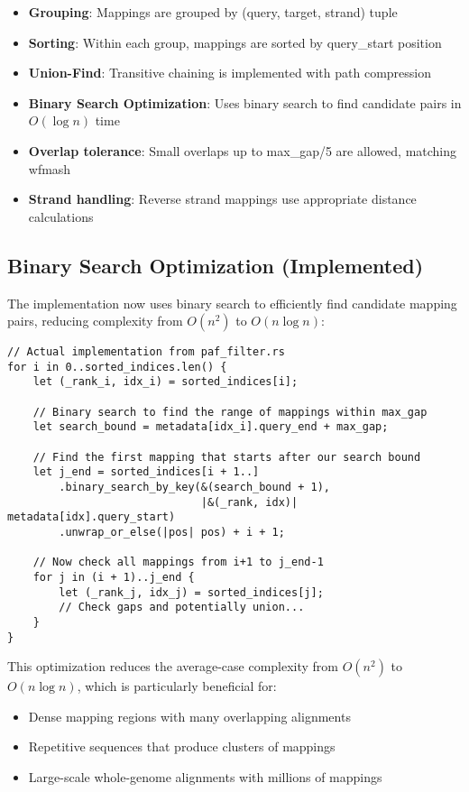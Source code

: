 \documentclass[11pt]{article}
\begin{document}
\begin{itemize}
    \item \textbf{Grouping}: Mappings are grouped by (query, target, strand) tuple
    \item \textbf{Sorting}: Within each group, mappings are sorted by query\_start position
    \item \textbf{Union-Find}: Transitive chaining is implemented with path compression
    \item \textbf{Binary Search Optimization}: Uses binary search to find candidate pairs in $O(\log n)$ time
    \item \textbf{Overlap tolerance}: Small overlaps up to max\_gap/5 are allowed, matching wfmash
    \item \textbf{Strand handling}: Reverse strand mappings use appropriate distance calculations
\end{itemize}

\subsection{Binary Search Optimization (Implemented)}

The implementation now uses binary search to efficiently find candidate mapping pairs, reducing complexity from $O(n^2)$ to $O(n \log n)$:

\begin{verbatim}
// Actual implementation from paf_filter.rs
for i in 0..sorted_indices.len() {
    let (_rank_i, idx_i) = sorted_indices[i];

    // Binary search to find the range of mappings within max_gap
    let search_bound = metadata[idx_i].query_end + max_gap;

    // Find the first mapping that starts after our search bound
    let j_end = sorted_indices[i + 1..]
        .binary_search_by_key(&(search_bound + 1),
                              |&(_rank, idx)| metadata[idx].query_start)
        .unwrap_or_else(|pos| pos) + i + 1;

    // Now check all mappings from i+1 to j_end-1
    for j in (i + 1)..j_end {
        let (_rank_j, idx_j) = sorted_indices[j];
        // Check gaps and potentially union...
    }
}
\end{verbatim}

This optimization reduces the average-case complexity from $O(n^2)$ to $O(n \log n)$, which is particularly beneficial for:
\begin{itemize}
    \item Dense mapping regions with many overlapping alignments
    \item Repetitive sequences that produce clusters of mappings
    \item Large-scale whole-genome alignments with millions of mappings
\end{itemize}
\end{document}

